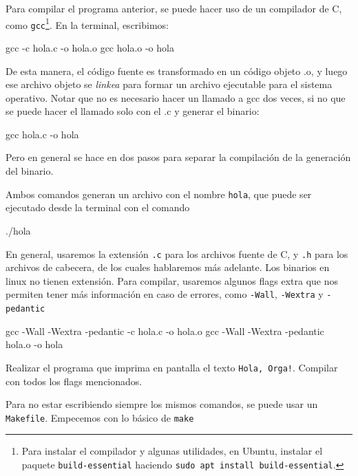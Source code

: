 \documentclass[]{scrartcl}
\begin{document}
Para compilar el programa anterior, se puede hacer uso de un compilador de C, como \texttt{gcc}\footnote{Para instalar el compilador y algunas utilidades, en Ubuntu, instalar el paquete \texttt{build-essential} haciendo \texttt{sudo apt install build-essential}.}. En la terminal, escribimos:
\begin{bashbox}[]
gcc -c hola.c -o hola.o
gcc hola.o -o hola
\end{bashbox}

De esta manera, el código fuente es transformado en un código objeto .o, y luego ese archivo objeto se \textit{linkea} para formar un archivo ejecutable para el sistema operativo.
Notar que no es necesario hacer un llamado a gcc dos veces, si no que se puede hacer el llamado solo con el .c y generar el binario:

\begin{bashbox}[]
gcc hola.c -o hola
\end{bashbox}

Pero en general se hace en dos pasos para separar la compilación de la generación del binario.

Ambos comandos generan un archivo con el nombre \texttt{hola}, que puede ser ejecutado desde la terminal con el comando

\begin{bashbox}[]
./hola
\end{bashbox}

En general, usaremos la extensión \texttt{.c} para los archivos fuente de C, y \texttt{.h} para los archivos de cabecera, de los cuales hablaremos más adelante. Los binarios en linux no tienen extensión.
Para compilar, usaremos algunos flags extra que nos permiten tener más información en caso de errores, como \texttt{-Wall}, \texttt{-Wextra} y \texttt{-pedantic}

\begin{bashbox}[]
gcc -Wall -Wextra -pedantic -c hola.c -o hola.o
gcc -Wall -Wextra -pedantic hola.o -o hola
\end{bashbox}

\begin{exbox}[label=ejercicio1]
  Realizar el programa que imprima en pantalla el texto \texttt{Hola, Orga!}. Compilar con todos los flags mencionados.
\end{exbox}

Para no estar escribiendo siempre los mismos comandos, se puede usar un \texttt{Makefile}. Empecemos con lo básico de \texttt{make}

\newpage
\end{document}
